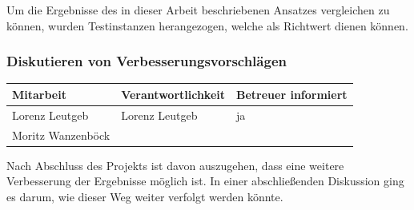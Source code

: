 Um die Ergebnisse des in dieser Arbeit beschriebenen Ansatzes vergleichen zu können, wurden Testinstanzen herangezogen, welche als Richtwert dienen können.

\subsubsection{ Diskutieren von Verbesserungsvorschlägen}

\begin{center}
\begin{tabular}{lll}
	Mitarbeit & Verantwortlichkeit & Betreuer informiert \\
	\hline
	Lorenz Leutgeb & Lorenz Leutgeb & ja \\
	Moritz Wanzenböck & & \\
\end{tabular}
\end{center}

Nach Abschluss des Projekts ist davon auszugehen, dass eine weitere Verbesserung der Ergebnisse möglich ist. In einer abschließenden Diskussion ging es darum, wie dieser Weg weiter verfolgt werden könnte.


